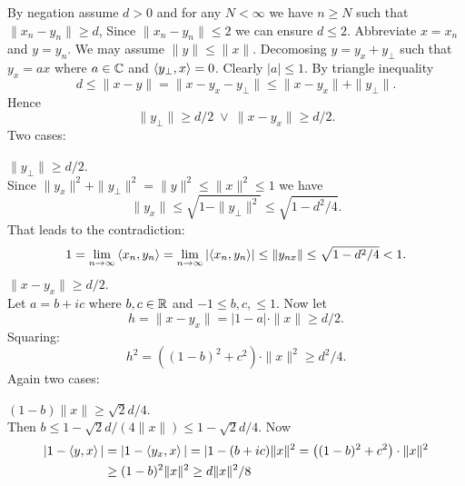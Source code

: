 \begin{enumerate}
\begin{itemize}
By negation assume \(d > 0\) and for any \(N<\infty\) we have \(n\geq N\)
such that \(\|x_n - y_n\| \geq d\),
Since \(\|x_n - y_n\|\leq 2\) we can ensure \(d \leq 2\).
Abbreviate \(x=x_n\) and \(y=y_n\). We may assume \(\|y\|\leq \|x\|\).
Decomosing \(y = y_x + y_\perp\) such that \(y_x = ax\) where \(a \in \mathbb{C}\)
and \(\left\langle y_\perp,x \right\rangle = 0\). Clearly \(|a|\leq 1\).
By triangle inequality
\begin{equation*}
d \leq \|x - y\| = \|x - y_x - y_\perp\| \leq \|x - y_x\| + \|y_\perp\|.
\end{equation*}
Hence
\begin{equation*}
\|y_\perp\| \geq d/2 \;\vee\: \|x - y_x\| \geq d/2.
\end{equation*}
Two cases:
\begin{enumerate}
 \(\|y_\perp\| \geq d/2\).\\
  Since \(\|y_x\|^2 + \|y_\perp\|^2 = \|y\|^2 \leq \|x\|^2 \leq 1\)
  we have \
  \begin{equation*}
   \|y_x\| \leq \sqrt{1 - \|y_\perp\|^2} \leq \sqrt{1 - d^2/4}.
  \end{equation*}
  That leads to the contradiction:
  \begin{equation*}
  1 = \lim_{n\to\infty}\left\langle x_n,y_n \right\rangle =
   \lim_{n\to\infty}\left|\left\langle x_n,y_n \right\rangle\right| \leq \|y_{nx}\|
   \leq \sqrt{1 - d^2/4} < 1.
  \end{equation*}
 \(\|x - y_x\| \geq d/2\).\\
  Let \(a = b +ic\) where \(b,c\in\mathbb{R}\) and \(-1\leq b,c,\leq 1\). Now let
  \begin{equation*}
  h = \|x - y_x\| = |1-a|\cdot\|x\| \geq d/2.
  \end{equation*}
  Squaring:
  \begin{equation*}
  h^2 = ((1-b)^2 + c^2)\cdot\|x\|^2 \geq d^2/4.
  \end{equation*}
  Again two cases: 
  \begin{itemize}
   \((1-b)\|x\| \geq \sqrt{2}d/4\).\\
    Then \(b \leq 1 - \sqrt{2}d/\left(4\|x\|\right) \leq 1 - \sqrt{2}d/4\).
    Now
    \begin{align*}
    |1 - \left\langle y,x \right\rangle|
    &= |1 - \left\langle y_x,x \right\rangle|
    = |1 - (b + ic)\|x\|^2
    = \left((1 - b)^2 + c^2\right)\cdot\|x\|^2 \\
    &\geq (1 - b)^2\|x\|^2
    \geq d\|x\|^2/8
    \end{align*}

\end{itemize}
\end{enumerate}
\end{itemize}
\end{enumerate}
